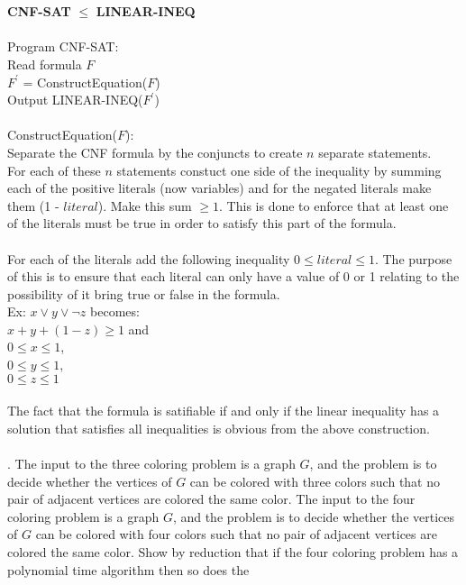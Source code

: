 \documentclass[10pt]{article}
\newcommand{\tab}{\hspace*{2em}}
\begin{document}
	\\
	\\
	\textbf{CNF-SAT} $\leq$ \textbf{LINEAR-INEQ}\\
	\\
	Program CNF-SAT:\\
	\tab Read formula $F$\\
	\tab $F^\prime$ = ConstructEquation($F$)\\ 
	\tab Output	LINEAR-INEQ($F^\prime$)\\
	\\
	ConstructEquation($F$):\\
	Separate the CNF formula by the conjuncts to create $n$ separate statements.\\
	For each of these $n$ statements constuct one side of the inequality by 
	summing each of the positive literals (now variables) and for the negated literals
	make them (1 - $literal$). 
	Make this sum $\geq 1$. This is done to enforce that at least one of the literals
	must be true in order to satisfy this part of the formula.\\
	\\
	For each of the literals add the following inequality $0 \leq literal \leq 1$. The
	purpose of this is to ensure that each literal can only have a value of 0 or 1 relating
	to the possibility of it bring true or false in the formula.  
	\\
	Ex: $x \vee y \vee \neg z$ becomes:\\ 
	$x + y + (1 - z) \geq 1$ and\\
	$0 \leq x \leq 1$,\\
	$0 \leq y \leq 1$,\\
	$0 \leq z \leq 1$\\
	\\
	The fact that the formula is satifiable if and only if the linear inequality has a solution that satisfies all
	inequalities is obvious from the above construction.\\
	\\
	.  The input to the three coloring problem is a graph $G$, and the problem is to decide whether the vertices
of $G$ can be colored with three colors such that no pair of adjacent vertices are colored the same color.
The input to the four coloring problem is a graph $G$, and the problem is to decide whether the vertices
of $G$ can be colored with four colors such that no pair of adjacent vertices are colored the same color.
Show by reduction that if the four coloring problem has a polynomial time algorithm then so does the
\end{document}

